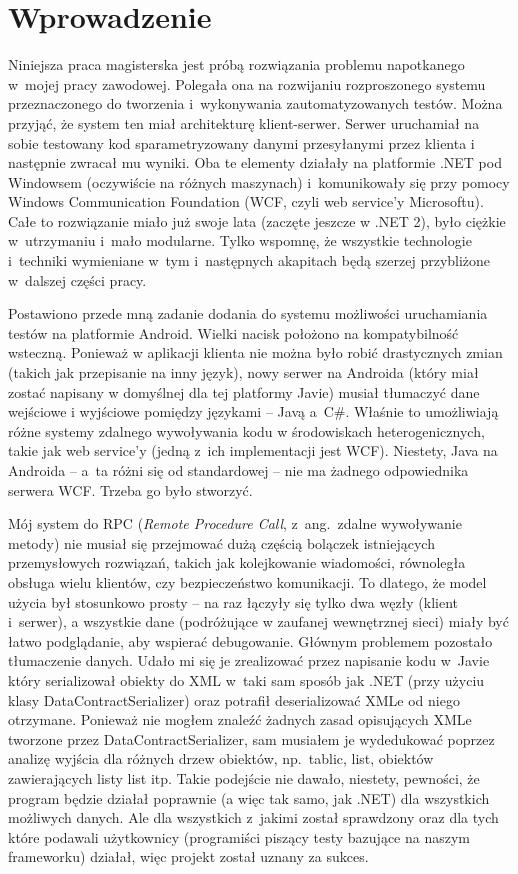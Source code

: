 \chapter{Wprowadzenie}
\label{intro}
Niniejsza praca magisterska jest próbą rozwiązania problemu napotkanego w~mojej pracy zawodowej. Polegała ona na rozwijaniu rozproszonego systemu przeznaczonego do tworzenia i~wykonywania zautomatyzowanych testów.
Można przyjąć, że system ten miał architekturę klient-serwer. Serwer uruchamiał na sobie testowany kod sparametryzowany danymi przesyłanymi przez klienta i następnie zwracał mu wyniki. Oba te elementy działały na platformie .NET pod Windowsem (oczywiście na różnych maszynach) i~komunikowały się przy pomocy Windows Communication Foundation (WCF, czyli web service'y Microsoftu).
Całe to rozwiązanie miało już swoje lata (zaczęte jeszcze w .NET 2), było ciężkie w~utrzymaniu i~mało modularne. Tylko wspomnę, że wszystkie technologie i~techniki wymieniane w~tym i~następnych akapitach będą szerzej przybliżone w~dalszej części pracy.

Postawiono przede mną zadanie dodania do systemu możliwości uruchamiania testów na platformie Android. Wielki nacisk położono na kompatybilność wsteczną. Ponieważ w aplikacji klienta nie można było robić drastycznych zmian (takich jak przepisanie na inny język), nowy serwer na Androida (który miał zostać napisany w domyślnej dla tej platformy Javie) musiał tłumaczyć dane wejściowe i wyjściowe pomiędzy językami -- Javą a~C\#.  Właśnie to umożliwiają różne systemy zdalnego wywoływania kodu w środowiskach heterogenicznych, takie jak web service'y (jedną z~ich implementacji jest WCF). Niestety, Java na Androida -- a~ta różni się od standardowej -- nie ma żadnego odpowiednika serwera WCF\@. Trzeba go było stworzyć.

Mój system do RPC (\emph{Remote Procedure Call}, z~ang.\ zdalne wywoływanie metody) nie musiał się przejmować dużą częścią bolączek istniejących przemysłowych rozwiązań, takich jak kolejkowanie wiadomości, równoległa obsługa wielu klientów, czy bezpieczeństwo komunikacji. To dlatego, że model użycia był stosunkowo prosty -- na raz łączyły się tylko dwa węzły (klient i~serwer), a wszystkie dane (podróżujące w zaufanej wewnętrznej sieci) miały być łatwo podglądanie, aby wspierać debugowanie. Głównym problemem pozostało tłumaczenie danych. Udało mi się je zrealizować przez napisanie kodu w~Javie który serializował obiekty do XML w~taki sam sposób jak .NET (przy użyciu klasy DataContractSerializer) oraz potrafił deserializować XMLe od niego otrzymane. Ponieważ nie mogłem znaleźć żadnych zasad opisujących XMLe tworzone przez DataContractSerializer, sam musiałem je wydedukować poprzez analizę wyjścia dla różnych drzew obiektów, np.\ tablic, list, obiektów zawierających listy list itp. Takie podejście nie dawało, niestety, pewności, że program będzie działał poprawnie (a więc tak samo, jak .NET) dla wszystkich możliwych danych. Ale dla wszystkich z~jakimi został sprawdzony oraz dla tych które podawali użytkownicy (programiści piszący testy bazujące na naszym frameworku) działał, więc projekt został uznany za sukces.

